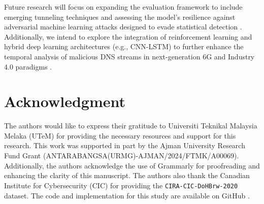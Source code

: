 \documentclass[journal]{IAENGtran}
\begin{document}
Future research will focus on expanding the evaluation framework to include emerging tunneling techniques and assessing the model's resilience against adversarial machine learning attacks designed to evade statistical detection \cite{chen2020generating, niu2020toward}. Additionally, we intend to explore the integration of reinforcement learning and hybrid deep learning architectures (e.g., CNN-LSTM) to further enhance the temporal analysis of malicious DNS streams in next-generation 6G and Industry 4.0 paradigms \cite{alzighaibi2023detection, sammour2026advanced, li2025harnessing}.

\section*{Acknowledgment}
The authors would like to express their gratitude to Universiti Teknikal Malaysia Melaka (UTeM) for providing the necessary resources and support for this research. This work was supported in part by the Ajman University Research Fund Grant (ANTARABANGSA(URMG)-AJMAN/2024/FTMK/A00069). Additionally, the authors acknowledge the use of Grammarly for proofreading and enhancing the clarity of this manuscript. The authors also thank the Canadian Institute for Cybersecurity (CIC) for providing the \texttt{CIRA-CIC-DoHBrw-2020} dataset. The code and implementation for this study are available on GitHub \cite{github_repo}.


\ifCLASSOPTIONcaptionsoff
  \newpage
\fi





%
%
%
\end{document}
